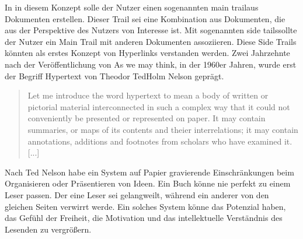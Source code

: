 In in diesem Konzept solle der Nutzer einen sogenannten \glqq main trail\grqq{ }aus Dokumenten erstellen. Dieser Trail sei eine Kombination aus Dokumenten, die aus der Perspektive des Nutzers von Interesse ist. Mit sogenannten \glqq side tails\grqq{ }sollte der Nutzer ein Main Trail mit anderen Dokumenten \glqq assoziieren\grqq{ }\cite[Section 7]{Bush1945}. Diese Side Trails könnten als erstes Konzept von Hyperlinks verstanden werden. Zwei Jahrzehnte nach der Veröffentlichung von \glqq As we may think\grqq{ }, in der 1960er Jahren, wurde erst der Begriff Hypertext von Theodor \glqq Ted\grqq{ }Holm Nelson geprägt. 

\begin{quote}
	\glqq Let me introduce the word hypertext to mean a body of written or pictorial material interconnected in such a complex way that it could not conveniently be presented or represented on paper. It may contain summaries, or maps of its contents and theier interrelations; it may contain annotations, additions and footnotes from scholars who have examined it. [...]\grqq{ }\cite{Nelson1965}
\end{quote}

Nach Ted Nelson habe ein System auf Papier gravierende Einschränkungen beim Organisieren oder Präsentieren von Ideen. Ein Buch könne nie perfekt zu einem Leser passen. Der eine Leser sei gelangweilt, während ein anderer von den gleichen Seiten verwirrt werde. \glqq Ein solches System könne das Potenzial haben, das Gefühl der Freiheit, die Motivation und das intellektuelle Verständnis des Lesenden zu vergrößern\grqq{ }\cite{Nelson1965}. 


